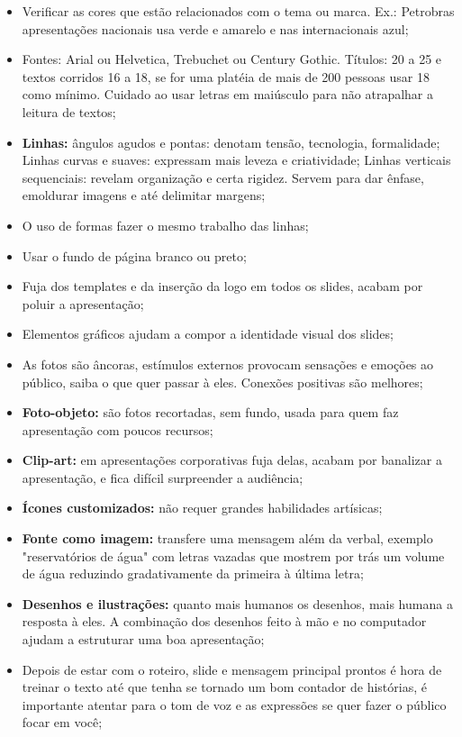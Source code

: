 \begin{itemize}
    \item Verificar as cores que estão relacionados com o tema ou marca. Ex.: Petrobras apresentações nacionais usa verde e amarelo e nas internacionais azul;
    \item Fontes: Arial ou Helvetica, Trebuchet ou Century Gothic. Títulos: 20 a 25 e textos corridos 16 a 18, se for uma platéia de mais de 200 pessoas usar 18 como mínimo. Cuidado ao usar letras em maiúsculo para não atrapalhar a leitura de textos;
    \item \textbf{Linhas:} ângulos agudos e pontas: denotam tensão, tecnologia, formalidade; Linhas curvas e suaves: expressam mais leveza e criatividade; Linhas verticais sequenciais: revelam organização e certa rigidez. Servem para dar ênfase, emoldurar imagens e até delimitar margens;
    \item O uso de formas fazer o mesmo trabalho das linhas;
    \item Usar o fundo de página branco ou preto;
    \item Fuja dos templates e da inserção da logo em todos os slides, acabam por poluir a apresentação;
    \item Elementos gráficos ajudam a compor a identidade visual dos slides;
    \item As fotos são âncoras, estímulos externos provocam sensações e emoções ao público, saiba o que quer passar à eles. Conexões positivas são melhores;
    \item \textbf{Foto-objeto:} são fotos recortadas, sem fundo, usada para quem faz apresentação com poucos recursos;
    \item \textbf{Clip-art:} em apresentações corporativas fuja delas, acabam por banalizar a apresentação, e fica difícil surpreender a audiência;
    \item \textbf{Ícones customizados:} não requer grandes habilidades artísicas; 
    \item \textbf{Fonte como imagem:} transfere uma mensagem além da verbal, exemplo "reservatórios de água"  com letras vazadas que mostrem por trás um volume de água reduzindo gradativamente da primeira à última letra;
    \item \textbf{Desenhos e ilustrações:} quanto mais humanos os desenhos, mais humana a resposta à eles. A combinação dos desenhos feito à mão e no computador ajudam a estruturar uma boa apresentação;
    \item Depois de estar com o roteiro, slide e mensagem principal prontos é hora de treinar o texto até que tenha se tornado um bom contador de histórias, é importante atentar para o tom de voz e as expressões se quer fazer o público focar em você;

\end{itemize}
